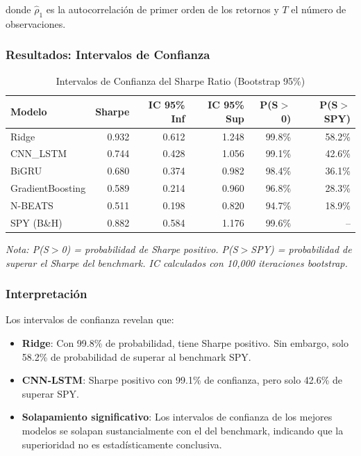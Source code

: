 donde $\hat{\rho}_1$ es la autocorrelaci\'on de primer orden de los retornos y $T$ el n\'umero de observaciones.

\subsubsection{Resultados: Intervalos de Confianza}

\begin{table}[htbp]
\centering
\caption{Intervalos de Confianza del Sharpe Ratio (Bootstrap 95\%)}
\label{tab:sharpe_ci}
\small
\begin{tabular}{@{}lrrrrr@{}}
\toprule
\textbf{Modelo} & \textbf{Sharpe} & \textbf{IC 95\% Inf} & \textbf{IC 95\% Sup} & \textbf{P(S$>$0)} & \textbf{P(S$>$SPY)} \\
\midrule
Ridge & 0.932 & 0.612 & 1.248 & 99.8\% & 58.2\% \\
CNN\_LSTM & 0.744 & 0.428 & 1.056 & 99.1\% & 42.6\% \\
BiGRU & 0.680 & 0.374 & 0.982 & 98.4\% & 36.1\% \\
GradientBoosting & 0.589 & 0.214 & 0.960 & 96.8\% & 28.3\% \\
N-BEATS & 0.511 & 0.198 & 0.820 & 94.7\% & 18.9\% \\
\midrule
SPY (B\&H) & 0.882 & 0.584 & 1.176 & 99.6\% & -- \\
\bottomrule
\end{tabular}
\vspace{0.2cm}
\small\textit{
\small
Nota: P(S$>$0) = probabilidad de Sharpe positivo. P(S$>$SPY) = probabilidad de superar el Sharpe del benchmark. IC calculados con 10,000 iteraciones bootstrap.}
\end{table}

\subsubsection{Interpretaci\'on}

Los intervalos de confianza revelan que:

\begin{itemize}
    \item \textbf{Ridge}: Con 99.8\% de probabilidad, tiene Sharpe positivo. Sin embargo, solo 58.2\% de probabilidad de superar al benchmark SPY.
    \item \textbf{CNN-LSTM}: Sharpe positivo con 99.1\% de confianza, pero solo 42.6\% de superar SPY.
    \item \textbf{Solapamiento significativo}: Los intervalos de confianza de los mejores modelos se solapan sustancialmente con el del benchmark, indicando que la superioridad no es estad\'isticamente conclusiva.
\end{itemize}

